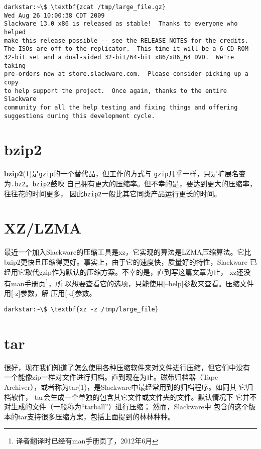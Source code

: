 \begin{Verbatim}[frame=single, commandchars=\\\{\}]
darkstar:~\$ \textbf{zcat /tmp/large_file.gz}
Wed Aug 26 10:00:38 CDT 2009
Slackware 13.0 x86 is released as stable!  Thanks to everyone who helped
make this release possible -- see the RELEASE_NOTES for the credits.
The ISOs are off to the replicator.  This time it will be a 6 CD-ROM
32-bit set and a dual-sided 32-bit/64-bit x86/x86_64 DVD.  We're taking
pre-orders now at store.slackware.com.  Please consider picking up a copy
to help support the project.  Once again, thanks to the entire Slackware
community for all the help testing and fixing things and offering
suggestions during this development cycle.
\end{Verbatim}

\section{bzip2}
\label{sec:archiveFiles:bzip2}
\textbf{bzip2}(1)是\texttt{gzip}的一个替代品，但工作的方式与
\texttt{gzip}几乎一样，只是扩展名变为\texttt{.bz2}。\texttt{bzip2}鼓吹
自己拥有更大的压缩率。但不幸的是，要达到更大的压缩率，往往花的时间更多，
因此\texttt{bzip2}一般比其它同类产品运行更长的时间。

\section{XZ/LZMA}
\label{sec:archiveFiles:bzip2}
最近一个加入Slackware的压缩工具是xz，它实现的算法是LZMA压缩算法。它比
bzip2更快且压缩得更好。事实上，由于它的速度快，质量好的特性，Slackware
已经用它取代gzip作为默认的压缩方案。不幸的是，直到写这篇文章为止，
xz还没有man手册页\footnote{译者翻译时已经有man手册页了，2012年6月}，所
以想要查看它的选项，只能使用[--help]参数来查看。压缩文件用[-z]参数，解
压用[-d]参数。
\begin{Verbatim}[frame=single, commandchars=\\\{\}]
darkstar:~\$ \textbf{xz -z /tmp/large_file}
\end{Verbatim}

\section{tar}
\label{sec:archiveFiles:tar}
很好，现在我们知道了怎么使用各种压缩软件来对文件进行压缩，但它们中没有
一个能像zip一样对文件进行归档。直到现在为止。磁带归档器（Tape
Archiver），或者称为tar(1)，是Slackware中最经常用到的归档程序。如同其
它归档软件， tar会生成一个单独的包含其它文件或文件夹的文件。默认情况下
它并不对生成的文件（一般称为``tarball''）进行压缩； 然而，Slackware中
包含的这个版本的tar支持很多压缩方案，包括上面提到的林林种种。

